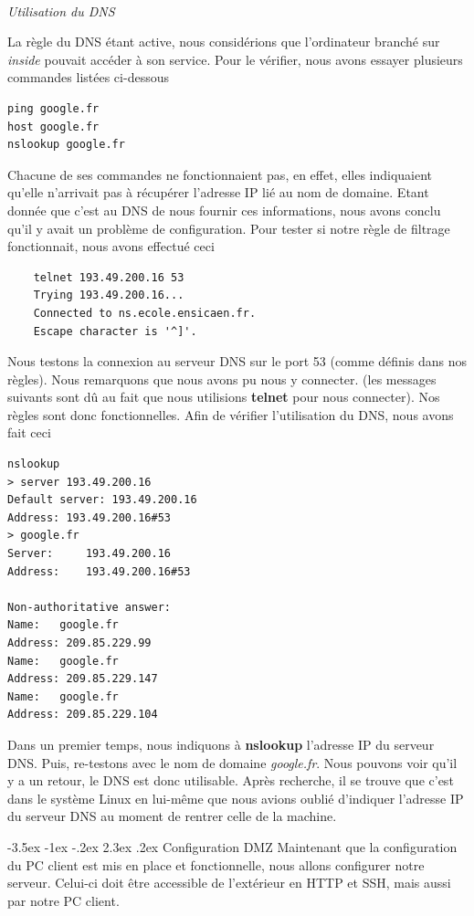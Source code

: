 \documentclass[a4paper,12pt]{article}
\makeatletter
\renewcommand\section{\@startsection {section}{1}{\z@}%
                           {-3.5ex \@plus -1ex \@minus -.2ex}%
                           {2.3ex \@plus.2ex}%
                           {\normalfont\Large\bfseries}}
\makeatother
\begin{document}
~

\textit{Utilisation du DNS}

La règle du DNS étant active, nous considérions que l'ordinateur branché sur \textit{inside} pouvait accéder à son service. Pour le vérifier, nous avons
essayer plusieurs commandes listées ci-dessous
\begin{lstlisting}
ping google.fr
host google.fr
nslookup google.fr
\end{lstlisting}

Chacune de ses commandes ne fonctionnaient pas, en effet, elles indiquaient qu'elle n'arrivait pas à récupérer l'adresse IP lié au nom de domaine. Etant
donnée que c'est au DNS de nous fournir ces informations, nous avons conclu qu'il y avait un problème de configuration. Pour tester si notre règle de 
filtrage fonctionnait, nous avons effectué ceci
\begin{lstlisting}
	telnet 193.49.200.16 53
	Trying 193.49.200.16...
	Connected to ns.ecole.ensicaen.fr.
	Escape character is '^]'.
\end{lstlisting}

Nous testons la connexion au serveur DNS sur le port 53 (comme définis dans nos règles). Nous remarquons que nous avons pu nous y connecter. (les messages
suivants sont dû au fait que nous utilisions \textbf{telnet} pour nous connecter). Nos règles sont donc fonctionnelles. Afin de vérifier l'utilisation du DNS,
nous avons fait ceci
\begin{lstlisting}
nslookup
> server 193.49.200.16
Default server: 193.49.200.16
Address: 193.49.200.16#53
> google.fr
Server:		193.49.200.16
Address:	193.49.200.16#53

Non-authoritative answer:
Name:	google.fr
Address: 209.85.229.99
Name:	google.fr
Address: 209.85.229.147
Name:	google.fr
Address: 209.85.229.104
\end{lstlisting}

Dans un premier temps, nous indiquons à \textbf{nslookup} l'adresse IP du serveur DNS. Puis, re-testons avec le nom de domaine \textit{google.fr}.
Nous pouvons voir qu'il y a un retour, le DNS est donc utilisable. Après recherche, il se trouve que c'est dans le système Linux en lui-même que 
nous avions oublié d'indiquer l'adresse IP du serveur DNS au moment de rentrer celle de la machine.


\newpage
\newpage
\section{Configuration DMZ}
Maintenant que la configuration du PC client est mis en place et fonctionnelle, nous allons configurer notre serveur. Celui-ci doit être accessible de 
l'extérieur en HTTP et SSH, mais aussi par notre PC client.
\end{document}
